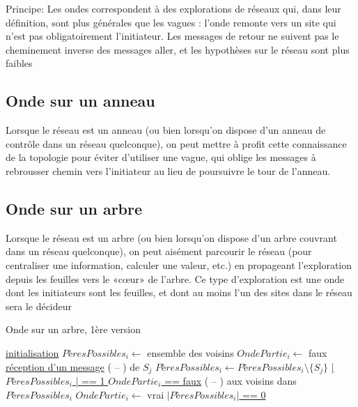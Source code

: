 \documentclass[a4paper,11pt]{article}
\begin{document}

\newpage
Principe: Les ondes correspondent à des explorations de réseaux qui, dans leur définition, sont plus générales que les vagues : l’onde remonte vers un site qui n’est pas obligatoirement l’initiateur. Les messages de retour ne suivent pas le cheminement inverse des messages aller, et les hypothèses sur le réseau sont plus faibles

\subsection{Onde sur un anneau}
Lorsque le réseau est un anneau (ou bien lorsqu’on dispose d’un anneau de contrôle dans un réseau quelconque), on peut mettre à profit cette connaissance de la topologie pour éviter d’utiliser une vague, qui oblige les messages à rebrousser chemin vers l’initiateur au lieu de poursuivre le tour de l’anneau.

\subsection{Onde sur un arbre}
Lorsque le réseau est un arbre (ou bien lorsqu’on dispose d’un arbre couvrant dans un réseau quelconque), on peut aisément parcourir le réseau (pour centraliser une information, calculer une valeur, etc.) en propageant l’exploration depuis les feuilles vers le «cœur» de l’arbre. Ce type d’exploration est une onde dont les initiateurs sont les feuilles, et dont au moins l’un des sites dans le réseau sera le décideur 

\begin{algorithm}
\DontPrintSemicolon
\SetAlgoVlined
\LinesNumbered

\caption{Onde sur un arbre, 1ère version}

\underline{initialisation} \;
  \Indp
  $PèresPossibles_{i} \gets$ ensemble des voisins \;
  $OndePartie_{i} \gets$ faux \;
  \Indm
\underline{réception d'un message} \;
  \Indp
  \recevoir( -- ) de $S_{j}$ \;
  $PèresPossibles_{i} \gets PèresPossibles_{i} \setminus \{ S_{j} \} $ \;
  \Indm
\underline{| $PèresPossibles_{i}$ | == 1 \et $OndePartie_{i}$ == faux} \;
  \Indp
   \;
  \envoyer( -- ) aux voisins dans $PèresPossibles_{i}$ \;
  $OndePartie_{i} \gets$ vrai \;
  \Indm
\underline{$| PèresPossibles_{i} |$ == 0} \;
  \Indp
   \;
   \;
  \Indm
\end{algorithm}

\newpage
\end{document}
